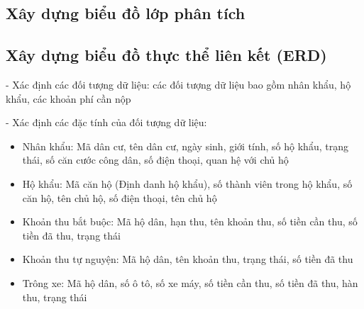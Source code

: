 \documentclass{article}
\begin{document}

\newpage

\subsection{Xây dựng biểu đồ lớp phân tích}





    

\subsection{Xây dựng biểu đồ thực thể liên kết (ERD)}
- Xác định các đối tượng dữ liệu: các đối tượng dữ liệu bao gồm nhân khẩu, hộ khẩu, các khoản phí cần nộp

- Xác định các đặc tính của đối tượng dữ liệu:
\begin{itemize}[leftmargin = 1.5cm]
    \item Nhân khẩu: Mã dân cư, tên dân cư, ngày sinh, giới tính, số hộ khẩu, trạng thái, số căn cước công dân, số điện thoại, quan hệ với chủ hộ
    
    \item Hộ khẩu: Mã căn hộ (Định danh hộ khẩu), số thành viên trong hộ khẩu, số căn hộ, tên chủ hộ, số điện thoại, tên chủ hộ
    
    \item Khoản thu bắt buộc: Mã hộ dân, hạn thu, tên khoản thu, số tiền cần thu, số tiền đã thu, trạng thái

    \item Khoản thu tự nguyện: Mã hộ dân, tên khoản thu, trạng thái, số tiền đã thu

    \item Trông xe: Mã hộ dân, số ô tô, số xe máy, số tiền cần thu, số tiền đã thu, hàn thu, trạng thái
\end{itemize}
\end{document}
